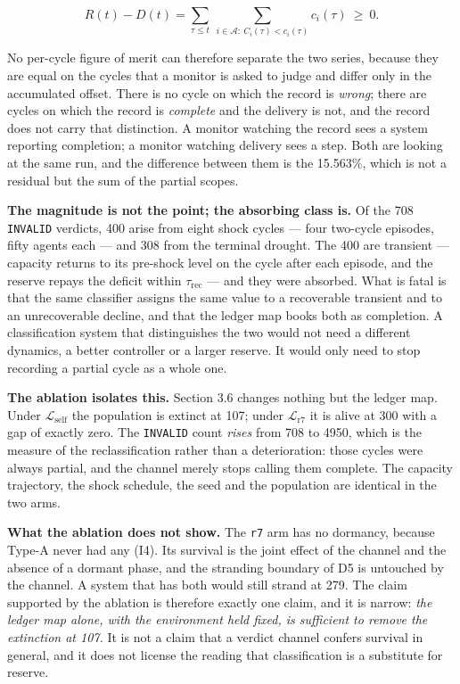 \documentclass[11pt,a4paper]{article}
\begin{document}
\[
R(t)-D(t)=\sum_{\tau\le t}\ \sum_{i\in\mathcal{A}:\ C_i(\tau)<c_i(\tau)} c_i(\tau)\ \ge\ 0 .
\]

No per-cycle figure of merit can therefore separate the two series, because they
are equal on the cycles that a monitor is asked to judge and differ only in the
accumulated offset. There is no cycle on which the record is \emph{wrong}; there are
cycles on which the record is \emph{complete} and the delivery is not, and the record
does not carry that distinction. A monitor watching the record sees a system
reporting completion; a monitor watching delivery sees a step. Both are looking at
the same run, and the difference between them is the 15.563\%, which is not a
residual but the sum of the partial scopes.

\textbf{The magnitude is not the point; the absorbing class is.} Of the 708 \texttt{INVALID}
verdicts, 400 arise from eight shock cycles --- four two-cycle episodes, fifty
agents each --- and 308 from the terminal drought. The 400 are transient --- capacity returns to its pre-shock level
on the cycle after each episode, and the reserve repays the deficit within
\(\tau_{\mathrm{rec}}\) --- and they were absorbed. What is fatal is that the same
classifier assigns the same value to a recoverable transient and to an
unrecoverable decline, and that the ledger map books both as completion. A
classification system that distinguishes the two would not need a different
dynamics, a better controller or a larger reserve. It would only need to stop
recording a partial cycle as a whole one.

\textbf{The ablation isolates this.} Section 3.6 changes nothing but the ledger map.
Under \(\mathcal{L}_{\mathrm{self}}\) the population is extinct at 107; under
\(\mathcal{L}_{\mathrm{r7}}\) it is alive at 300 with a gap of exactly zero. The
\texttt{INVALID} count \emph{rises} from 708 to 4950, which is the measure of the
reclassification rather than a deterioration: those cycles were always partial,
and the channel merely stops calling them complete. The capacity trajectory, the
shock schedule, the seed and the population are identical in the two arms.

\textbf{What the ablation does not show.} The \texttt{r7} arm has no dormancy, because Type-A
never had any (I4). Its survival is the joint effect of the channel and the absence
of a dormant phase, and the stranding boundary of D5 is untouched by the channel. A
system that has both would still strand at 279. The claim supported by the ablation
is therefore exactly one claim, and it is narrow: \emph{the ledger map alone, with the
environment held fixed, is sufficient to remove the extinction at 107.} It is not a
claim that a verdict channel confers survival in general, and it does not license
the reading that classification is a substitute for reserve.
\end{document}
